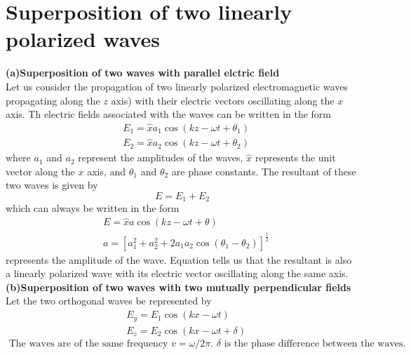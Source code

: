  \section{Superposition of two linearly polarized waves}
 \textbf{(a)Superposition of two waves with parallel elctric field}\\
 Let us consider the propagation of two linearly polarized electromagnetic waves propagating along the $z$ axis) with their electric vectors oscillating along the $x$ axis. Th electric fields associated with the waves can be written in the form
 $$
 \begin{aligned}
 &E_{1}=\hat{x} a_{1} \cos \left(k z-\omega t+\theta_{1}\right) \\
 &E_{2}=\hat{x} a_{2} \cos \left(k z-\omega t+\theta_{2}\right)
 \end{aligned}
 $$
 where $a_{1}$ and $a_{2}$ represent the amplitudes of the waves, $\hat{x}$ represents the unit vector along the $x$ axis, and $\theta_{1}$ and $\theta_{2}$ are phase constants. The resultant of these two waves is given by
 $$
 E=E_{1}+E_{2}
 $$
 which can always be written in the form
 $$
 \begin{aligned}
 &E=\hat{x} a \cos (k z-\omega t+\theta) \\
 &a=\left[a_{1}^{2}+a_{2}^{2}+2 a_{1} a_{2} \cos \left(\theta_{1}-\theta_{2}\right)\right]^{\frac{1}{2}}
 \end{aligned}
 $$
represents the amplitude of the wave. Equation tells us that the resultant is also a linearly polarized wave with its electric vector oscillating along the same axis.\\
\textbf{(b)Superposition of two waves with two mutually perpendicular fields}\\
Let the two orthogonal waves be represented by
$$
\begin{aligned}
&E_{y}=E_{1} \cos (k x-\omega t) \\
&E_{z}=E_{2} \cos (k x-\omega t+\delta)
\end{aligned}
$$
$\text { The waves are of the same frequency } v=\omega / 2 \pi \text {. } \delta \text { is the phase difference between the waves. }$
 
